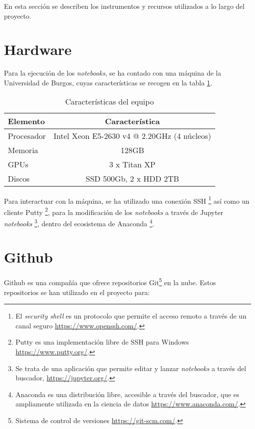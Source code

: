  \label{capitulo4}

En esta sección se describen los instrumentos y recursos utilizados a lo largo del proyecto. 

\section{Hardware}

Para la ejecución de los \textit{notebooks}, se ha contado con una máquina de la Universidad de Burgos, cuyas características se recogen en la tabla \ref{caracteristicaspc}.

\begin{table}[h!]
\begin{tabular}{l c}
Elemento & Característica \\
\hline
Procesador & Intel Xeon E5-2630 v4 @ 2.20GHz (4 núcleos)\\
Memoria & 128GB\\
GPUs & 3 x Titan XP\\
Discos & SSD 500Gb, 2 x HDD 2TB\\
\end{tabular}
\caption{\label{caracteristicaspc} Características del equipo}
\end{table}

Para interactuar con la máquina, se ha utilizado una conexión SSH \footnote{El \textit{security shell} es un protocolo que permite el acceso remoto a través de un canal seguro \url{https://www.openssh.com/}.} así como un cliente Putty \footnote{Putty es una implementación libre de SSH para Windows \url{https://www.putty.org/}.}, para la modificación de los \textit{notebooks} a través de Jupyter \textit{notebooks} \footnote{Se trata de una aplicación que permite editar y lanzar \textit{notebooks} a través del buscador, \url{https://jupyter.org/}.}, dentro del ecosistema de Anaconda \footnote{Anaconda es una distribución libre, accesible a través del buscador, que es ampliamente utilizada en la ciencia de datos \url{https://www.anaconda.com/}.}.

\section{Github}

Github es una compañía que ofrece repositorios Git\footnote{Sistema de control de versiones \url{https://git-scm.com/}.} en la nube. 
Estos repositorios se han utilizado en el proyecto para:

